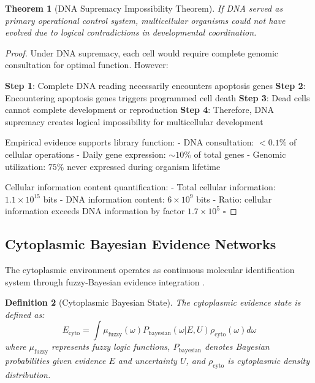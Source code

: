 \documentclass[12pt,a4paper]{article}
\newtheorem{theorem}{Theorem}[section]
\newtheorem{definition}[theorem]{Definition}
\begin{document}
\begin{theorem}[DNA Supremacy Impossibility Theorem]
If DNA served as primary operational control system, multicellular organisms could not have evolved due to logical contradictions in developmental coordination.
\end{theorem}

\begin{proof}
Under DNA supremacy, each cell would require complete genomic consultation for optimal function. However:

\textbf{Step 1}: Complete DNA reading necessarily encounters apoptosis genes
\textbf{Step 2}: Encountering apoptosis genes triggers programmed cell death
\textbf{Step 3}: Dead cells cannot complete development or reproduction
\textbf{Step 4}: Therefore, DNA supremacy creates logical impossibility for multicellular development

Empirical evidence supports library function:
- DNA consultation: $<0.1\%$ of cellular operations \citep{watson2014molecular}
- Daily gene expression: $\sim 10\%$ of total genes \citep{consortium2012integrated}
- Genomic utilization: $75\%$ never expressed during organism lifetime

Cellular information content quantification:
- Total cellular information: $1.1 \times 10^{15}$ bits
- DNA information content: $6 \times 10^9$ bits  
- Ratio: cellular information exceeds DNA information by factor $1.7 \times 10^5$ $\square$
\end{proof}

\subsection{Cytoplasmic Bayesian Evidence Networks}

The cytoplasmic environment operates as continuous molecular identification system through fuzzy-Bayesian evidence integration \citep{koller2009probabilistic}.

\begin{definition}[Cytoplasmic Bayesian State]
The cytoplasmic evidence state is defined as:
$$E_{\text{cyto}} = \int \mu_{\text{fuzzy}}(\omega) P_{\text{bayesian}}(\omega | E, U) \rho_{\text{cyto}}(\omega) d\omega$$
where $\mu_{\text{fuzzy}}$ represents fuzzy logic functions, $P_{\text{bayesian}}$ denotes Bayesian probabilities given evidence $E$ and uncertainty $U$, and $\rho_{\text{cyto}}$ is cytoplasmic density distribution.
\end{definition}
\end{document}
